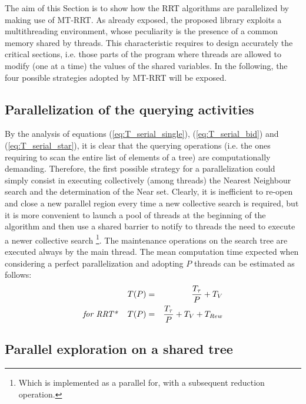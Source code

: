 The aim of this Section is to show how the RRT algorithms are parallelized by making use of MT-RRT.
As already exposed, the proposed library exploits a multithreading environment, whose peculiarity is the presence of a common memory shared by threads. This characteristic requires to design accurately the critical sections, i.e. those parts of the program where threads are allowed to modify (one at a time) the values of the shared variables. 
In the following, the four possible strategies adopted by MT-RRT will be exposed.

\subsection{Parallelization of the querying activities}
\label{subsec:MT_01}

By the analysis of equations (\ref{eq:T_serial_single}), (\ref{eq:T_serial_bid}) and (\ref{eq:T_serial_star}), it is clear that the querying operations (i.e. the ones requiring to scan the entire list of elements of a tree) are computationally demanding. Therefore, the first possible strategy for a parallelization could simply consist in executing collectively (among threads) the Nearest Neighbour search and the determination of the Near set.
Clearly, it is inefficient to re-open and close a new parallel region every time a new collective search is required, but it is more convenient to launch a pool of threads at the beginning of the algorithm and then use a shared barrier to notify to threads the need to execute a newer collective search \footnote{Which is implemented as a parallel for, with a subsequent reduction operation.}. 
The maintenance operations on the search tree are executed always by the main thread.
The mean computation time expected when considering a perfect parallelization and adopting $P$ threads can be estimated as follows:
\begin{eqnarray}
T(P) &=& \frac{T_{\tau}}{P} + T_V \nonumber\\
\textit{for RRT*  \,\,\,\,\,} T(P) &=& \frac{T_{\tau}}{P} + T_V + T_{Rew} 
\end{eqnarray}
  
\subsection{Parallel exploration on a shared tree}
\label{subsec:MT_02}

